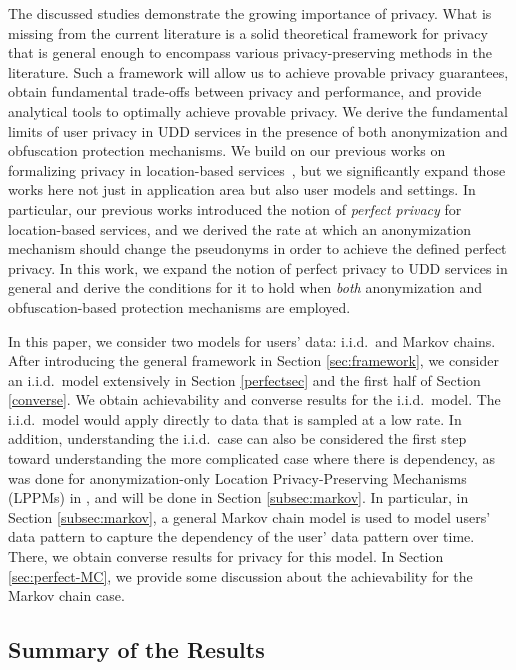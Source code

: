 The discussed studies demonstrate the growing importance of privacy. What is missing from the current literature is a solid theoretical framework for privacy that is general enough to encompass various privacy-preserving methods in the literature. Such a framework will allow us to achieve provable privacy guarantees, obtain fundamental trade-offs between privacy and performance, and provide analytical tools to optimally achieve provable privacy. We derive the fundamental limits of user privacy in UDD services in the presence of both anonymization and obfuscation protection mechanisms.  We build on our previous works on formalizing privacy in location-based services~\cite{tifs2016, ciss2017}, but we significantly expand those works here not just in application area but also user models and settings. In particular, our previous works introduced the notion of \emph{perfect privacy} for location-based services, and we derived the rate at which an anonymization mechanism should change the pseudonyms in order to achieve the defined perfect privacy. In this work, we expand the notion of perfect privacy to UDD services in general and derive the conditions for it to hold when \emph{both} anonymization and obfuscation-based protection mechanisms are employed.

In this paper, we consider two models for users' data: i.i.d.\ and Markov chains. After introducing the general framework in Section \ref{sec:framework}, we consider an i.i.d.\ model extensively in Section \ref{perfectsec} and the first half of Section \ref{converse}. We obtain achievability and converse results for the i.i.d.\ model. The i.i.d.\ model would apply directly to data that is sampled at a low rate. In addition, understanding the i.i.d.\ case can also be considered the first step toward understanding the more complicated case where there is dependency, as was done for anonymization-only Location Privacy-Preserving Mechanisms (LPPMs) in \cite{tifs2016}, and will be done in Section \ref{subsec:markov}. In particular, in Section \ref{subsec:markov}, a general Markov chain model is used to model users' data pattern to capture the dependency of the user' data pattern over time. There, we obtain converse results for privacy for this model. In Section \ref{sec:perfect-MC}, we provide some discussion about the achievability for the Markov chain case.


\subsection{Summary of the Results}

